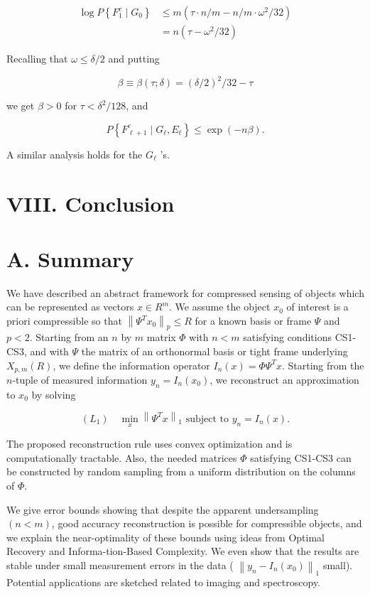 \documentclass[10pt]{article}
\begin{document}
$$
\begin{aligned}
\log P\left\{F_{1}^{c} \mid G_{0}\right\} & \leq m\left(\tau \cdot n / m-n / m \cdot \omega^{2} / 32\right) \\
& =n\left(\tau-\omega^{2} / 32\right)
\end{aligned}
$$

Recalling that $\omega \leq \delta / 2$ and putting

$$
\beta \equiv \beta(\tau ; \delta)=(\delta / 2)^{2} / 32-\tau
$$

we get $\beta>0$ for $\tau<\delta^{2} / 128$, and

$$
P\left\{F_{\ell+1}^{c} \mid G_{\ell}, E_{\ell}\right\} \leq \exp (-n \beta) .
$$

A similar analysis holds for the $G_{\ell}$ 's.

\section*{VIII. Conclusion}
\section*{A. Summary}
We have described an abstract framework for compressed sensing of objects which can be represented as vectors $x \in R^{m}$. We assume the object $x_{0}$ of interest is a priori compressible so that $\left\|\Psi^{T} x_{0}\right\|_{p} \leq R$ for a known basis or frame $\Psi$ and $p<2$. Starting from an $n$ by $m$ matrix $\Phi$ with $n<m$ satisfying conditions CS1-CS3, and with $\Psi$ the matrix of an orthonormal basis or tight frame underlying $X_{p, m}(R)$, we define the information operator $I_{n}(x)=\Phi \Psi^{T} x$. Starting from the $n$-tuple of measured information $y_{n}=I_{n}\left(x_{0}\right)$, we reconstruct an approximation to $x_{0}$ by solving

$$
\left(L_{1}\right) \quad \min _{x}\left\|\Psi^{T} x\right\|_{1} \text { subject to } y_{n}=I_{n}(x) .
$$

The proposed reconstruction rule uses convex optimization and is computationally tractable. Also, the needed matrices $\Phi$ satisfying CS1-CS3 can be constructed by random sampling from a uniform distribution on the columns of $\Phi$.

We give error bounds showing that despite the apparent undersampling $(n<m)$, good accuracy reconstruction is possible for compressible objects, and we explain the near-optimality of these bounds using ideas from Optimal Recovery and Informa-tion-Based Complexity. We even show that the results are stable under small measurement errors in the data ( $\left\|y_{n}-I_{n}\left(x_{0}\right)\right\|_{1}$ small). Potential applications are sketched related to imaging and spectroscopy.
\end{document}
